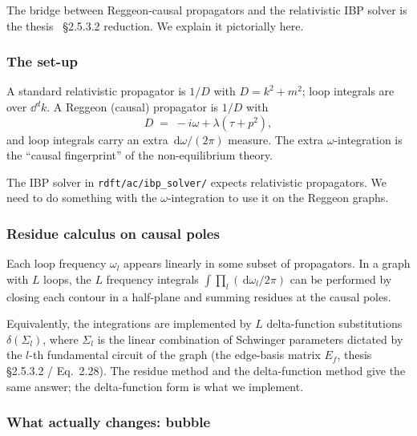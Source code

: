 \documentclass[11pt,a4paper]{article}
\renewcommand{\dd}[1]{\,\mathrm{d}#1}
\theoremstyle{definition}
\theoremstyle{plain}
\begin{document}
The bridge between Reggeon-causal propagators and the relativistic IBP
solver is the thesis~\cite{amarteifio2019} \S 2.5.3.2 reduction.  We
explain it pictorially here.

\subsubsection{The set-up}

\begin{stdbox}
A standard relativistic propagator is $1/D$ with $D = k^2 + m^2$;
loop integrals are over $\dd^d k$.  A Reggeon (causal) propagator
is $1/D$ with
\[
  D \;=\; -i\omega + \lambda(\tau + p^2),
\]
and loop integrals carry an extra $\dd \omega/(2\pi)$ measure.  The
extra $\omega$-integration is the ``causal fingerprint'' of the
non-equilibrium theory.

The IBP solver in \texttt{rdft/ac/ibp\_solver/} expects relativistic
propagators.  We need to do something with the $\omega$-integration
to use it on the Reggeon graphs.
\end{stdbox}

\subsubsection{Residue calculus on causal poles}

\begin{cfacbox}
Each loop frequency $\omega_l$ appears linearly in some subset of
propagators.  In a graph with $L$ loops, the $L$ frequency integrals
$\int \prod_l (\dd\omega_l/2\pi)$ can be performed by closing each
contour in a half-plane and summing residues at the causal poles.

Equivalently, the integrations are implemented by $L$ delta-function
substitutions $\delta(\Sigma_l)$, where $\Sigma_l$ is the linear
combination of Schwinger parameters dictated by the $l$-th
fundamental circuit of the graph (the edge-basis matrix $E_f$, thesis
\S 2.5.3.2 / Eq.~2.28).  The residue method and the delta-function
method give the same answer; the delta-function form is what we
implement.
\end{cfacbox}

\subsubsection{What actually changes: bubble}
\end{document}
